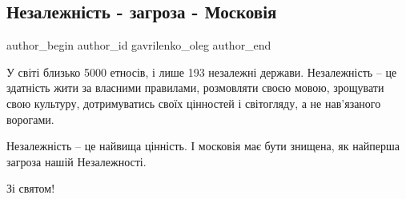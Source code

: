  
 
 
 
 
 
\subsection{Незалежність - загроза - Московія}
\label{sec:24_08_2019.fb.gavrilenko_oleg.1.nezalezhnist_ugroza_moskovia}
 
\ifcmt
 author_begin
   author_id gavrilenko_oleg
 author_end
\fi

У світі близько 5000 етносів, і лише 193 незалежні держави. Незалежність – це
здатність жити за власними правилами, розмовляти своєю мовою, зрощувати свою
культуру, дотримуватись своїх цінностей і світогляду, а не нав'язаного
ворогами.

Незалежність – це найвища цінність. І московія має бути знищена, як найперша
загроза нашій Незалежності.

Зі святом!

